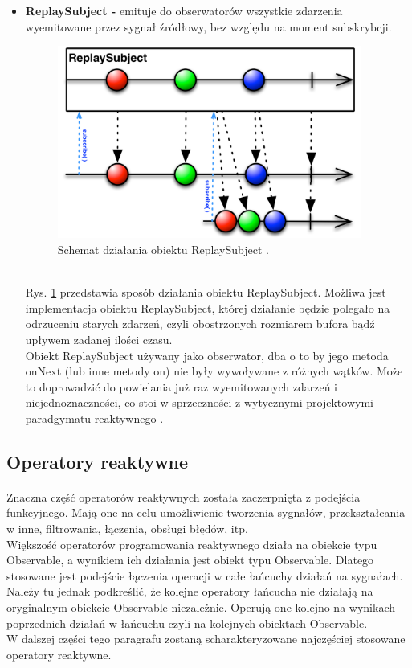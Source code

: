 \documentclass[12pt,oneside,a4paper]{report}
\begin{document}
\begin{itemize}
	\item \textbf{ReplaySubject -} emituje do obserwatorów wszystkie zdarzenia wyemitowane przez sygnał źródłowy, bez względu na moment subskrybcji. 
	\begin{figure}[ht!]
		\centering
		\includegraphics[width=10cm]{replaySubject}
		\caption{Schemat działania obiektu ReplaySubject \cite{subjects}.}
		\label{replaySubject}
	\end{figure}\\
	Rys. \ref{replaySubject} przedstawia sposób działania obiektu ReplaySubject.
	Możliwa jest implementacja obiektu ReplaySubject, której działanie będzie polegało na odrzuceniu starych zdarzeń, czyli obostrzonych rozmiarem bufora bądź upływem zadanej ilości czasu.\\
	Obiekt ReplaySubject używany jako obserwator, dba o to by jego metoda onNext (lub inne metody on) nie były wywoływane z różnych wątków. Może to doprowadzić do powielania już raz wyemitowanych zdarzeń i niejednoznaczności, co stoi w sprzeczności z wytycznymi projektowymi paradgymatu reaktywnego \cite{rxDesignGuideline}. 
	
\end{itemize}


\subsection{Operatory reaktywne}
\paragraph{}Znaczna część operatorów reaktywnych została zaczerpnięta z podejścia funkcyjnego. Mają one na celu umożliwienie tworzenia sygnałów, przekształcania w inne, filtrowania, łączenia, obsługi błędów, itp.\\
Większość operatorów programowania reaktywnego działa na obiekcie typu Observable, a wynikiem ich działania jest obiekt typu Observable. Dlatego stosowane jest podejście łączenia operacji w całe łańcuchy działań na sygnałach. Należy tu jednak podkreślić, że kolejne operatory łańcucha nie działają na oryginalnym obiekcie Observable niezależnie. Operują one kolejno na wynikach poprzednich działań w łańcuchu czyli na kolejnych obiektach Observable. \\
W dalszej części tego paragrafu zostaną scharakteryzowane najczęściej stosowane operatory reaktywne.
\end{document}
